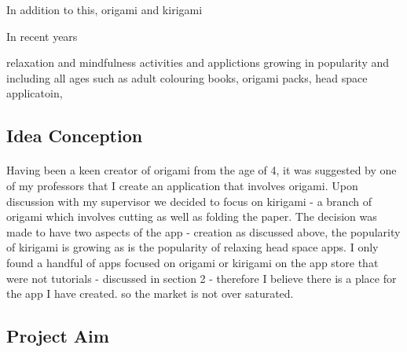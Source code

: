 \documentclass[11pt]{article}
\begin{document}
                In addition to this,  origami and kirigami 
            
            
    
                In recent years
            
                relaxation and mindfulness activities and applictions growing in popularity and including all ages such as adult colouring books, origami packs, head space applicatoin, 
                
        
        \subsection{Idea Conception}
            
                    \paragraph{} 
                        Having been a keen creator of origami from the age of 4, it was suggested by one of my professors that I create an application that involves origami. Upon discussion with my supervisor we decided to focus on kirigami - a branch of origami which involves cutting as well as folding the paper. The decision was made to have two aspects of the app - creation 
                        as discussed above, the popularity of kirigami is growing as is the popularity of relaxing head space apps. I only found a handful of apps focused on origami or kirigami on the app store that were not tutorials - discussed in section 2 - therefore I believe there is a place for the app I have created. so the market is not over saturated. 
        
                \subsection{Project Aim}
            
                 \paragraph{} 
                 
                 
\end{document}
